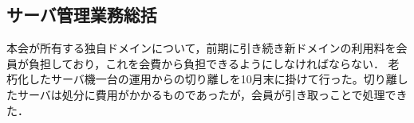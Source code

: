 \subsection*{サーバ管理業務総括}

本会が所有する独自ドメインについて，前期に引き続き新ドメインの利用料を会員が負担しており，これを会費から負担できるようにしなければならない．
老朽化したサーバ機一台の運用からの切り離しを10月末に掛けて行った。切り離したサーバは処分に費用がかかるものであったが，会員が引き取っことで処理できた．

